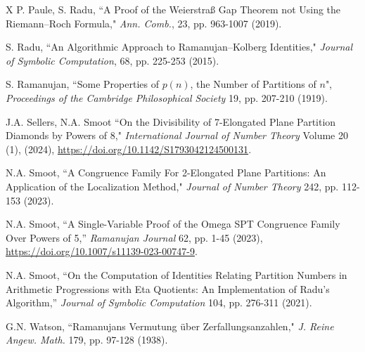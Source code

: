 \documentclass[reqno]{amsart}
\theoremstyle{definition}
\theoremstyle{remark}
\numberwithin{equation}{section}
\begin{document}
\begin{thebibliography}{X}
 P. Paule, S. Radu, ``A Proof of the Weierstraß Gap Theorem not Using the Riemann--Roch Formula," \textit{Ann. Comb.}, 23, pp. 963-1007 (2019).

 S. Radu, ``An Algorithmic Approach to Ramanujan--Kolberg Identities," \textit{Journal of Symbolic Computation}, 68, pp. 225-253 (2015).

 S. Ramanujan, ``Some Properties of $p(n)$, the Number of Partitions of $n$", \textit{Proceedings of the Cambridge Philosophical Society} 19, pp. 207-210 (1919).

 J.A. Sellers, N.A. Smoot ``On the Divisibility of 7-Elongated Plane Partition Diamonds by Powers of 8," \textit{International Journal of Number Theory} Volume 20 (1), (2024), \url{https://doi.org/10.1142/S1793042124500131}.

 N.A. Smoot, ``A Congruence Family For 2-Elongated Plane Partitions: An Application of the Localization Method," \textit{Journal of Number Theory} 242, pp. 112-153 (2023).

 N.A. Smoot, ``A Single-Variable Proof of the Omega SPT Congruence Family Over Powers of 5,'' \textit{Ramanujan Journal} 62, pp. 1-45 (2023), \url{https://doi.org/10.1007/s11139-023-00747-9}.

 N.A. Smoot, ``On the Computation of Identities Relating Partition Numbers in Arithmetic Progressions with Eta Quotients: An Implementation of Radu's Algorithm,'' \textit{Journal of Symbolic Computation} 104, pp. 276-311 (2021).

 G.N. Watson, ``Ramanujans Vermutung über Zerfallungsanzahlen," \textit{J. Reine Angew. Math.} 179, pp. 97-128 (1938).

\end{thebibliography}
\end{document}

